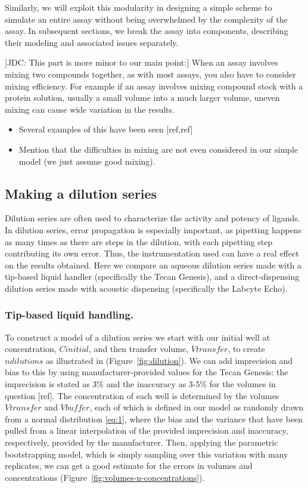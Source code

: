 \documentclass[aps,pre,twocolumn,nofootinbib,superscriptaddress,linenumbers]{revtex4-1}
\begin{document}
Similarly, we will exploit this modularity in designing a simple scheme to simulate an entire assay without being overwhelmed by the complexity of the assay.
In subsequent sections, we break the assay into components, describing their modeling and associated issues separately.

{\color{red}[JDC: This part is more minor to our main point:]}
When an assay involves mixing two compounds together, as with most assays, you also have to consider mixing efficiency. 
For example if an assay involves mixing compound stock with a protein solution, usually a small volume into a much larger volume, uneven mixing can cause wide variation in the results. 
\begin{itemize}
  \item Several examples of this have been seen [ref,ref]
  \item Mention that the difficulties in mixing are not even considered in our simple model (we just assume good mixing).
\end{itemize}

\subsection*{Making a dilution series}

Dilution series are often used to characterize the activity and potency of ligands. 
In dilution series, error propagation is especially important, as pipetting happens as many times as there are steps in the dilution, with each pipetting step contributing its own error. 
Thus, the instrumentation used can have a real effect on the results obtained.
Here we compare an aqueous dilution series made with a tip-based liquid handler (specifically the Tecan Genesis), and a direct-dispensing dilution series made with acoustic dispensing (specifically the Labcyte Echo).

\subsubsection*{Tip-based liquid handling.}

To construct a model of a dilution series we start with our initial well at concentration, $Cinitial$, and then transfer volume, $Vtransfer$, to create $ndilutions$ as illustrated in (Figure~\ref{fig:dilution}). 
We can add imprecision and bias to this by using manufacturer-provided values for the Tecan Genesis: the imprecision is stated as 3\% and the inaccuracy as 3-5\% for the volumes in question [ref]. 
The concentration of each well is determined by the volumes $Vtransfer$ and $Vbuffer$, each of which is defined in our model as randomly drawn from a normal distribution \ref{eq:1}, where the bias and the variance that have been pulled from a linear interpolation of the provided imprecision and inaccuracy, respectively, provided by the manufacturer.
Then, applying the parametric bootstrapping model, which is simply sampling over this variation with many replicates, we can get a good estimate for the errors in volumes and concentrations (Figure~\ref{fig:volumes-n-concentrations}).
\end{document}
